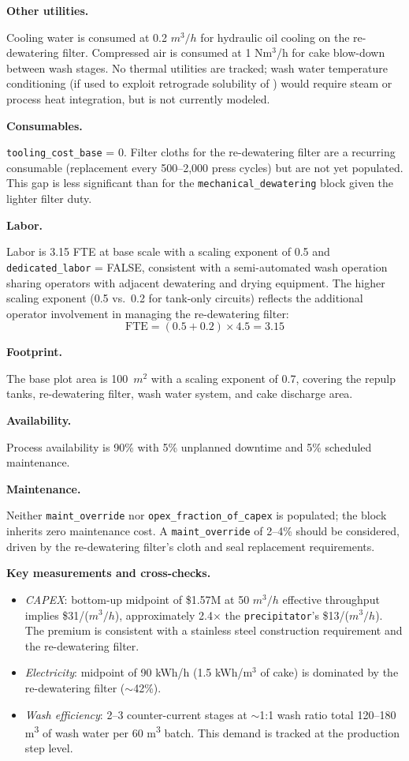 \medskip
\noindent\textbf{Other utilities.}\quad

Cooling water is consumed at 0.2 $\si{m^3/h}$ for hydraulic oil cooling on the re-dewatering filter. Compressed air is consumed at 1 Nm$^3$/h for cake blow-down between wash stages. No thermal utilities are tracked; wash water temperature conditioning (if used to exploit retrograde solubility of ) would require steam or process heat integration, but is not currently modeled.

\medskip
\noindent\textbf{Consumables.}\quad

\texttt{tooling\_cost\_base} = 0. Filter cloths for the re-dewatering filter are a recurring consumable (replacement every 500--2,000 press cycles) but are not yet populated. This gap is less significant than for the \texttt{mechanical\_dewatering} block given the lighter filter duty.

\medskip
\noindent\textbf{Labor.}\quad

Labor is 3.15 FTE at base scale with a scaling exponent of 0.5 and \texttt{dedicated\_labor} = FALSE, consistent with a semi-automated wash operation sharing operators with adjacent dewatering and drying equipment. The higher scaling exponent (0.5 vs.\ 0.2 for tank-only circuits) reflects the additional operator involvement in managing the re-dewatering filter:
\[
	\text{FTE} = (0.5 + 0.2) \times 4.5 = 3.15
\]

\medskip
\noindent\textbf{Footprint.}\quad

The base plot area is 100~$\si{m^2}$ with a scaling exponent of 0.7, covering the repulp tanks, re-dewatering filter, wash water system, and cake discharge area.

\medskip
\noindent\textbf{Availability.}\quad

Process availability is 90\% with 5\% unplanned downtime and 5\% scheduled maintenance.

\medskip
\noindent\textbf{Maintenance.}\quad

Neither \texttt{maint\_override} nor \texttt{opex\_fraction\_of\_capex} is populated; the block inherits zero maintenance cost. A \texttt{maint\_override} of 2--4\% should be considered, driven by the re-dewatering filter's cloth and seal replacement requirements.

\medskip
\noindent\textbf{Key measurements and cross-checks.}\quad

\begin{itemize}[noitemsep]
	\item \textit{CAPEX}: bottom-up midpoint of \$1.57M at 50 $\si{m^3/h}$ effective throughput implies \$31/($\si{m^3/h}$), approximately 2.4$\times$ the \texttt{precipitator}'s \$13/($\si{m^3/h}$). The premium is consistent with a stainless steel construction requirement and the re-dewatering filter.
	\item \textit{Electricity}: midpoint of 90 kWh/h (1.5 kWh/m$^3$ of cake) is dominated by the re-dewatering filter ($\sim$42\%).
	\item \textit{Wash efficiency}: 2--3 counter-current stages at $\sim$1:1 wash ratio total 120--180 \si{m^3} of wash water per 60 \si{m^3} batch. This demand is tracked at the production step level.
\end{itemize}

